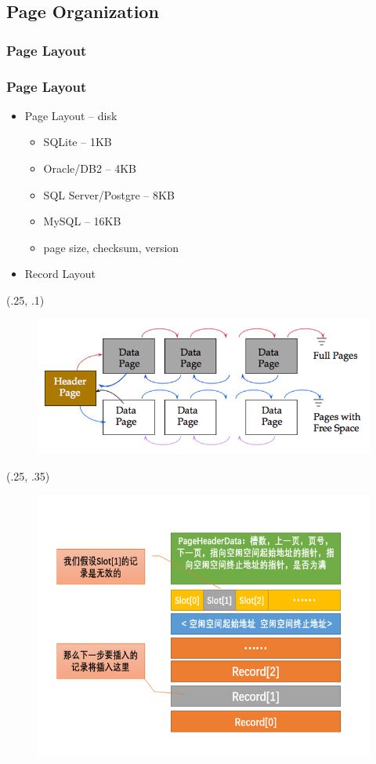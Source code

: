 \subsection{Page Organization}

\subsubsection{Page Layout}

\begin{frame}[fragile]
	\frametitle{Page Layout}
	\begin{itemize}
		\item Page Layout – disk
		\begin{itemize}
			\item SQLite – 1KB
			\item Oracle/DB2 – 4KB
			\item SQL Server/Postgre – 8KB
			\item MySQL – 16KB
			\item page size, checksum, version
		\end{itemize}
		\item Record Layout
	\end{itemize}
	\begin{textblock*}{.9\paperwidth}(.25\paperwidth, .1\paperheight) %
		\begin{figure}
			\includegraphics[width=.4\linewidth]{figs/dbfile-heapfile1.png}
		\end{figure}
	\end{textblock*}
	\begin{textblock*}{.9\paperwidth}(.25\paperwidth, .35\paperheight) %
		\begin{figure}
			\includegraphics[width=.4\linewidth]{figs/dbfile-records.png}
		\end{figure}
	\end{textblock*}
\end{frame}


